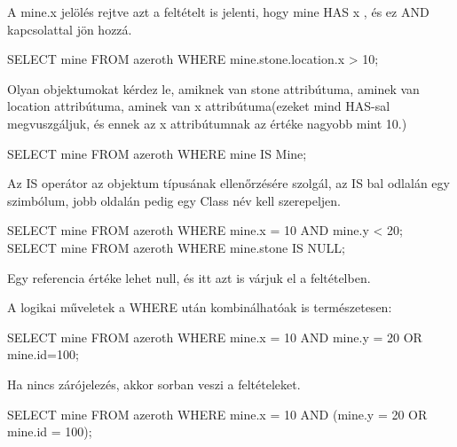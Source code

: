 A mine.x jelölés rejtve azt a feltételt is jelenti, hogy mine HAS x , és ez AND kapcsolattal jön hozzá.
\begin{sql}
SELECT mine FROM azeroth WHERE mine.stone.location.x > 10;
\end{sql}

Olyan objektumokat kérdez le, amiknek van stone attribútuma, aminek van location attribútuma, aminek van x attribútuma(ezeket mind HAS-sal megvuszgáljuk, és ennek az x attribútumnak az értéke nagyobb mint 10.)
\begin{sql}
SELECT mine FROM azeroth WHERE mine IS Mine;
\end{sql}
Az IS operátor az objektum típusának ellenőrzésére szolgál, az IS bal odlalán egy szimbólum, jobb oldalán pedig egy Class név kell szerepeljen.
\begin{sql}
SELECT mine FROM azeroth WHERE mine.x = 10 AND mine.y < 20;
SELECT mine FROM azeroth WHERE mine.stone IS NULL;
\end{sql}
Egy referencia értéke lehet null, és itt azt is várjuk el a feltételben.

A logikai műveletek a WHERE után kombinálhatóak is természetesen:
\begin{sql}
SELECT mine FROM azeroth WHERE mine.x = 10 AND mine.y = 20 OR mine.id=100;
\end{sql}
Ha nincs zárójelezés, akkor sorban veszi a feltételeket.
\begin{sql}
SELECT mine FROM azeroth WHERE mine.x = 10 AND (mine.y = 20 OR mine.id = 100);
\end{sql}

